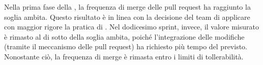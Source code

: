 \par Nella prima fase della , la frequenza di merge delle pull request ha raggiunto la soglia ambita. Questo risultato è in linea con la decisione del team di applicare con maggior rigore la pratica di . Nel dodicesimo sprint, invece, il valore misurato è rimasto al di sotto della soglia ambita, poiché l'integrazione delle modifiche (tramite il meccanismo delle pull request) ha richiesto più tempo del previsto. Nonostante ciò, la frequenza di merge è rimasta entro i limiti di tollerabilità.
